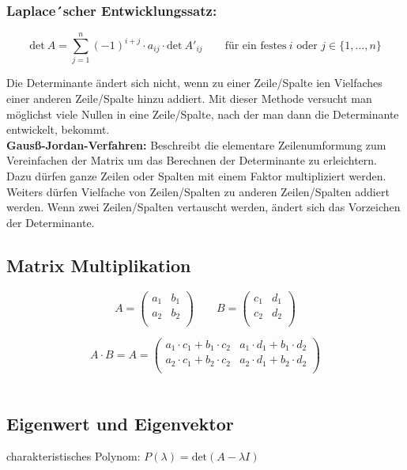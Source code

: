 \subsubsection{Laplace´scher Entwicklungssatz:}

\[
\text{det}\ A=\sum\limits_{j=1}^{n}(-1)^{i+j}\cdot a_{ij}\cdot \text{det}\ A'_{ij}\qquad \text{für ein festes}\ i\text{ oder } j \in \{1,\ldots,n \}
\]

Die Determinante ändert sich nicht, wenn zu einer Zeile/Spalte ien Vielfaches einer anderen Zeile/Spalte hinzu addiert. Mit dieser Methode versucht man möglichst viele Nullen in eine Zeile/Spalte, nach der man dann die Determinante entwickelt, bekommt.\\

\textbf{Gausß-Jordan-Verfahren:} Beschreibt die elementare Zeilenumformung zum Vereinfachen der Matrix um das Berechnen der Determinante zu erleichtern. Dazu dürfen ganze Zeilen oder Spalten mit einem Faktor multipliziert werden. Weiters dürfen Vielfache von Zeilen/Spalten zu anderen Zeilen/Spalten addiert werden. Wenn zwei Zeilen/Spalten vertauscht werden, ändert sich das Vorzeichen der Determinante.

\subsection{Matrix Multiplikation}

\[A=\begin{pmatrix}
 a_1 & b_1 \\
 a_2 & b_2 \\
\end{pmatrix} \qquad
B=\begin{pmatrix}
 c_1 & d_1 \\
 c_2 & d_2 \\
\end{pmatrix}\]

\[A\cdot B = 
A=\begin{pmatrix}
 a_1 \cdot c_1 + b_1 \cdot c_2 & a_1 \cdot d_1 + b_1 \cdot d_2 \\
 a_2 \cdot c_1 + b_2 \cdot c_2 & a_2 \cdot d_1 + b_2 \cdot d_2 \\
\end{pmatrix}\]\\

\subsection{Eigenwert und Eigenvektor}
charakteristisches Polynom: $P(\lambda)=\text{det}(A-\lambda I)$\\

